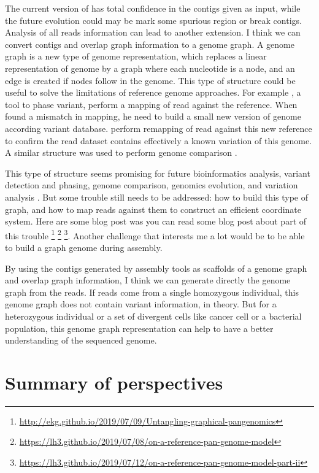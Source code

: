 \documentclass[main.tex]{subfiles}
\begin{document}
The current version of \knot has total confidence in the contigs given as input, while the future evolution could may be mark some spurious region or break contigs. Analysis of all reads information can lead to another extension. I think we can convert contigs and \knot overlap graph information to a genome graph. A genome graph is a new type of genome representation, which replaces a linear representation of genome by a graph where each nucleotide is a node, and an edge is created if nodes follow in the genome. This type of structure could be useful to solve the limitations of reference genome approaches. 
For example  \cite{whatshap}, a tool to phase variant, perform a mapping of read against the reference. When  found a mismatch in mapping, he need to build a small new version of genome according variant database.  perform remapping of read against this new reference to confirm the read dataset contains effectively a known variation of this genome. A similar structure was used to perform genome comparison  \cite{cactus_graph}.

This type of structure seems promising for future bioinformatics analysis, variant detection and phasing, genome comparison,  genomics evolution, and variation analysis \cite{goodbye_ref_hello_graphs}. But some trouble still needs to be addressed: how to build this type of graph, and how to map reads against them to construct an efficient coordinate system.
Here are some blog post was you can read some blog post about part of this trouble \footnote{\url{http://ekg.github.io/2019/07/09/Untangling-graphical-pangenomics}} \footnote{\url{https://lh3.github.io/2019/07/08/on-a-reference-pan-genome-model}} \footnote{\url{https://lh3.github.io/2019/07/12/on-a-reference-pan-genome-model-part-ii}}. Another challenge that interests me a lot would be to be able to build a graph genome during assembly.

By using the contigs generated by assembly tools as scaffolds of a genome graph and \knot overlap graph  information, I think we can generate directly the genome graph from the reads. If reads come from a single homozygous individual, this genome graph does not contain variant information, in theory. But for a heterozygous individual or a set of divergent cells like cancer cell or a bacterial population, this genome graph representation can help to have a better understanding of the sequenced genome.

\section*{Summary of perspectives}
\end{document}

